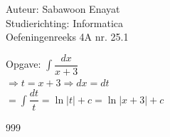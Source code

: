 \documentclass[a4paper]{article}
\begin{document}
  
\noindent \large Auteur: Sabawoon Enayat \\
\noindent \large Studierichting: Informatica\\
\noindent \large Oefeningenreeks 4A nr. 25.1 \\

\newcommand{\dint}{\displaystyle\int}

\medskip

\normalsize

Opgave: $\dint \dfrac{dx}{x + 3}$\\

$\Rightarrow t = x + 3 \Rightarrow dx = dt$\\

$= \dint \dfrac{dt}{t} = \ln |t| + c = \ln |x + 3| + c$\\

\begin{thebibliography}{999}
\end{thebibliography}
\end{document}
